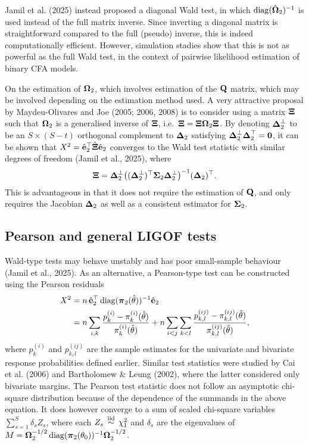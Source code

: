 \documentclass[
  letterpaper,
  DIV=11,
  numbers=noendperiod]{scrartcl}
\begin{document}
Jamil et al. (2025) instead proposed a diagonal Wald test, in which
\(\operatorname{diag}(\hat{{\boldsymbol\Omega}}_2)^{-1}\) is used instead of the full matrix
inverse. Since inverting a diagonal matrix is straightforward compared
to the full (pseudo) inverse, this is indeed computationally efficient.
However, simulation stadies show that this is not as powerful as the
full Wald test, in the context of pairwise likelihood estimation of
binary CFA models.

On the estimation of \({\boldsymbol\Omega}_2\), which involves estimation of the
\({\mathbf Q}\) matrix, which may be involved depending on the estimation method
used. A very attractive proposal by Maydeu-Olivares and Joe (2005; 2006,
2008) is to consider using a matrix \({\boldsymbol\Xi}\) such that \({\boldsymbol\Omega}_2\) is
a generalised inverse of \({\boldsymbol\Xi}\), i.e.~\({\boldsymbol\Xi} = {\boldsymbol\Xi} {\boldsymbol\Omega}_2 {\boldsymbol\Xi}\).
By denoting \({\boldsymbol\Delta}_{2}^\perp\) to be an \(S\times (S-t)\) orthogonal
complement to \({\boldsymbol\Delta}_{2}\) satisfying
\({\boldsymbol\Delta}_{2}^\perp {\boldsymbol\Delta}_{2}^\top = {\mathbf 0}\), it can be shown that
\(X^2 = \hat{{\mathbf e}}_2^\top \hat{{\boldsymbol\Xi}} \hat{{\mathbf e}}_2\) converges to the Wald test
statistic with similar degrees of freedom (Jamil et al., 2025), where \[
{\boldsymbol\Xi} = {\boldsymbol\Delta}_{2}^\perp \big( ({\boldsymbol\Delta}_{2}^\perp)^\top {\boldsymbol\Sigma}_2 {\boldsymbol\Delta}_{2}^\perp \big)^{-1} ({\boldsymbol\Delta}_{2})^\top.
\] This is advantageous in that it does not require the estimation of
\({\mathbf Q}\), and only requires the Jacobian \({\boldsymbol\Delta}_{2}\) as well as a
consistent estimator for \({\boldsymbol\Sigma}_2\).

\subsection{Pearson and general LIGOF
tests}\label{pearson-and-general-ligof-tests}

Wald-type tests may behave unstably and has poor small-sample behaviour
(Jamil et al., 2025). As an alternative, a Pearson-type test can be
constructed using the Pearson residuals \[
\begin{aligned}
X^2 
&= n \, \hat{{\mathbf e}}_2^\top \operatorname{diag}({\boldsymbol\pi}_2(\hat\theta))^{-1} \hat{{\mathbf e}}_2 \\
&= 
n \sum_{i,k} \frac{p_k^{(i)} - \pi_k^{(i)}(\hat\theta)}{\pi_k^{(i)}(\hat\theta)} +
n \sum_{i<j}\sum_{k<l} \frac{p_{k,l}^{(ij)} - \pi_{k,l}^{(ij)}(\hat\theta)}{\pi_{k,l}^{(ij)}(\hat\theta)},
\end{aligned}
\] where \(p_k^{(i)}\) and \(p_{k,l}^{(ij)}\) are the sample estimates
for the univariate and bivariate response probabilities defined earlier.
Similar test statistics were studied by Cai et al. (2006) and
Bartholomew \& Leung (2002), where the latter considered only bivariate
margins. The Pearson test statistic does not follow an asymptotic
chi-square distribution because of the dependence of the summands in the
above equation. It does however converge to a sum of scaled chi-square
variables \(\sum_{s=1}^S \delta_s Z_s\), where each
\(Z_s \,\overset{\text{iid}}{\sim}\, \chi^2_1\) and \(\delta_s\) are the eigenvalues of
\(M={\boldsymbol\Omega}_2^{-1/2} \operatorname{diag}({\boldsymbol\pi}_2(\theta_0))^{-1} {\boldsymbol\Omega}_2^{-1/2}\).
\end{document}
